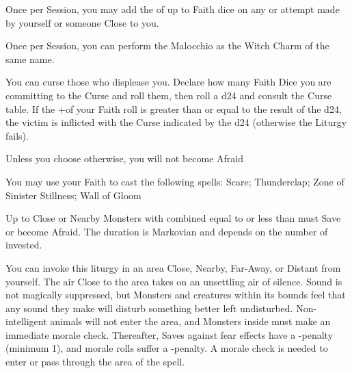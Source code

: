 {

Once per Session, you may add  the \SUMDICE of up to \LVL Faith dice on any \RO or \RB attempt made by yourself or someone Close to you.





\GOD[
Name=Vecna,
Link=small-god-vecna,
GodOf=Archfiend of Curses,
Holy=a severed hand hung from the neck or belt
]


Once per Session, you can perform the Malocchio as the Witch Charm of the same name.



You can curse those who displease you.  Declare how many Faith Dice you are committing to the Curse and roll them, then roll a d24 and consult the Curse table.  If the \SUMDICE+\LVL of your Faith roll is greater than or equal to the result of the d24, the victim is inflicted with the Curse indicated by the d24 (otherwise the Liturgy fails).




\GOD[
Name=Xibalba,
Link=small-god-xibalba,
GodOf=Fiendish Prince of Fear,
Holy=a white cowl and blank mask
]


Unless you choose otherwise, you will not become Afraid


You may use your Faith to cast the following spells: Scare; Thunderclap; Zone of Sinister Stillness; Wall of Gloom

\LITURGY [
  Name= Scare,
  Link= xibalba-liturgy-scare,
  Paradigm= Mind ,
  Save=  Y (negates) ,
  Duration= Markovian ,
  Counter=  n/a  ,
  Keywords= Splittable ,
  Target=   Close or Nearby Monsters
]



Up to \DICE Close or Nearby Monsters with combined \HD equal to or less than \DICE must Save or become Afraid.  The duration is Markovian and depends on the number of \DICE invested.

\LITURGY [
  Name= Sinister Stillness,
  Link=xibalba-liturgy-sinister stillness,
  Paradigm= Mind ,
  Save=  N ,
  Duration= Combat or \SUMDICE Minutes ,
  Counter=  n/a  ,
  Keywords= None ,
  Target=Any Area
]



You can invoke this liturgy in an area  Close, Nearby, Far-Away, or Distant from yourself.  The air Close to the area takes on an unsettling air of silence.  Sound is not magically suppressed, but Monsters and creatures within its bounds feel that any sound they make will disturb something better left undisturbed.  Non-intelligent animals will not enter the area, and Monsters inside must make an immediate morale check. Thereafter, Saves against fear effects have a -\DICE penalty (minimum 1), and morale rolls suffer a -\DICE penalty.  A morale check is needed to enter or pass through the area of the spell.

}

